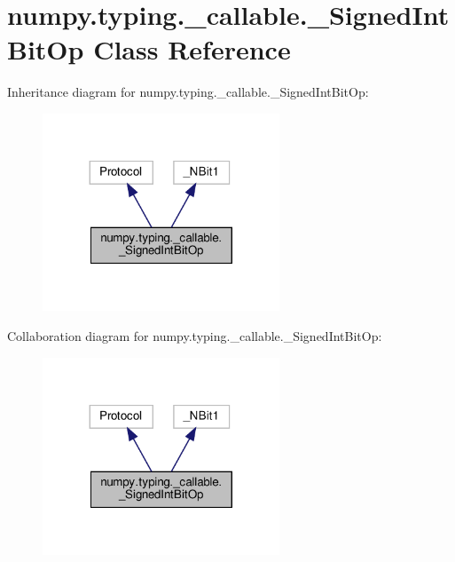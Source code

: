 \hypertarget{classnumpy_1_1typing_1_1__callable_1_1__SignedIntBitOp}{}\section{numpy.\+typing.\+\_\+callable.\+\_\+\+Signed\+Int\+Bit\+Op Class Reference}
\label{classnumpy_1_1typing_1_1__callable_1_1__SignedIntBitOp}


Inheritance diagram for numpy.\+typing.\+\_\+callable.\+\_\+\+Signed\+Int\+Bit\+Op\+:
\nopagebreak
\begin{figure}[H]
\begin{center}
\leavevmode
\includegraphics[width=200pt]{classnumpy_1_1typing_1_1__callable_1_1__SignedIntBitOp__inherit__graph}
\end{center}
\end{figure}


Collaboration diagram for numpy.\+typing.\+\_\+callable.\+\_\+\+Signed\+Int\+Bit\+Op\+:
\nopagebreak
\begin{figure}[H]
\begin{center}
\leavevmode
\includegraphics[width=200pt]{classnumpy_1_1typing_1_1__callable_1_1__SignedIntBitOp__coll__graph}
\end{center}
\end{figure}
